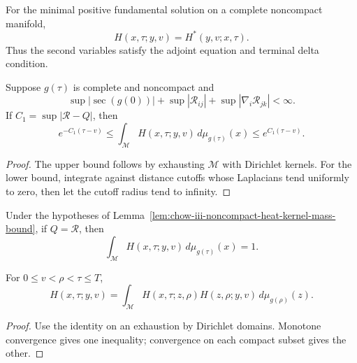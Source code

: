 \begin{lemma}
\label{lem:chow-iii-noncompact-heat-adjoint-symmetry}
For the minimal positive fundamental solution on a complete noncompact
manifold,
\[
 H(x,\tau;y,v)=H^*(y,v;x,\tau).
\]
Thus the second variables satisfy the adjoint equation and terminal delta
condition.
\end{lemma}

\begin{lemma}
\label{lem:chow-iii-noncompact-heat-kernel-mass-bound}
Suppose \(g(\tau)\) is complete and noncompact and
\[
 \sup|\sec(g(0))|+\sup|\mathcal R_{ij}|+\sup|\nabla_i\mathcal R_{jk}|<\infty.
\]
If \(C_1=\sup|\mathcal R-Q|\), then
\[
 e^{-C_1(\tau-v)}\le\int_{\mathcal M}H(x,\tau;y,v)
 \,d\mu_{g(\tau)}(x)\le e^{C_1(\tau-v)}.
\]
\end{lemma}
\begin{proof}
The upper bound follows by exhausting \(\mathcal M\) with Dirichlet kernels.
For the lower bound, integrate against distance cutoffs whose Laplacians tend
uniformly to zero, then let the cutoff radius tend to infinity.
\end{proof}

\begin{corollary}
\label{cor:chow-iii-noncompact-heat-kernel-mass-preservation}
Under the hypotheses of Lemma~\ref{lem:chow-iii-noncompact-heat-kernel-mass-bound},
if \(Q=\mathcal R\), then
\[
 \int_{\mathcal M}H(x,\tau;y,v)\,d\mu_{g(\tau)}(x)=1.
\]
\end{corollary}

\begin{lemma}
\label{lem:chow-iii-noncompact-heat-kernel-semigroup}
For \(0\le v<\rho<\tau\le T\),
\[
 H(x,\tau;y,v)=\int_{\mathcal M}H(x,\tau;z,\rho)
 H(z,\rho;y,v)\,d\mu_{g(\rho)}(z).
\]
\end{lemma}
\begin{proof}
Use the identity on an exhaustion by Dirichlet domains.  Monotone convergence
gives one inequality; convergence on each compact subset gives the other.
\end{proof}

